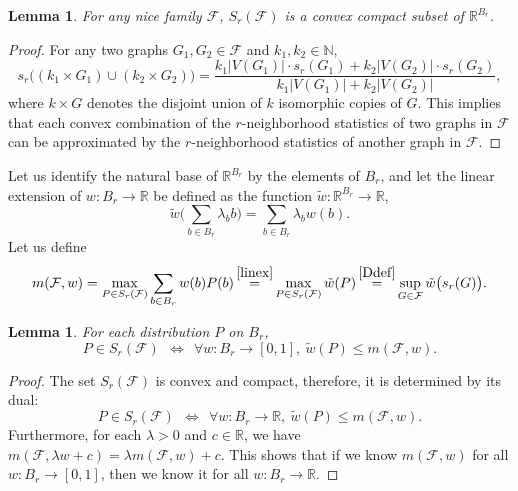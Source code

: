 \documentclass[12pt,a4paper]{article}
\newtheorem{Lemma}[Theorem]{Lemma}
\newcommand{\F}{\mathcal{F}}
\newcommand{\N}{\mathbb{N}}
\newcommand{\R}{\mathbb{R}}
\renewcommand{\:}{\colon}
\begin{document}
\begin{Lemma} \label{convex}
For any nice family $\F$, $S_r(\F)$ is a convex compact subset of $\R^{B_r}$.
\end{Lemma}

\begin{proof}
For any two graphs $G_1, G_2 \in \F$ and $k_1,k_2 \in \N$,
\begin{equation*}
s_r\big((k_1 \times G_1) \cup (k_2 \times G_2)\big) = \frac{k_1 |V(G_1)| \cdot s_r(G_1) + k_2 |V(G_2)| \cdot s_r(G_2)}{k_1 |V(G_1)| + k_2 |V(G_2)|},
\end{equation*}
where $k \times G$ denotes the disjoint union of $k$ isomorphic copies of $G$. 
This implies that each convex combination of the $r$-neighborhood statistics of two graphs in $\F$ can be approximated by the $r$-neighborhood statistics of another graph in $\F$.
\end{proof}

Let us identify the natural base of $\R^{B_r}$ by the elements of $B_r$, and let the linear extension of $w\: B_r \rightarrow \R$ be defined as the function $\tilde{w} \: \R^{B_r} \rightarrow \R$,
\begin{equation} \label{linex}
\tilde{w}\Big( \sum_{b \in B_r} \lambda_b b \Big) = \sum_{b \in B_r} \lambda_b w(b).
\end{equation}
Let us define
\begin{equation} \label{mdef}
m(\F, w) = \max_{P \in S_r(\F)} \sum_{b \in B_r} w(b) P(b) \mathop{=}^{\eqref{linex}} \max_{P \in S_r(\F)} \tilde{w}(P) \mathop{=}^{\eqref{Ddef}} \sup_{G \in \F} \tilde{w}\big( s_r(G) \big).
\end{equation}

\begin{Lemma}\label{lem:convexdist}
For each distribution $P$ on $B_r$,
\begin{equation*}
P \in S_r(\F)\ \ \Leftrightarrow\ \ \forall w\: B_r \rightarrow [0, 1],\ \tilde{w}(P) \le m(\F, w).
\end{equation*}
\end{Lemma}

\begin{proof}
The set $S_r(\F)$ is convex and compact, therefore, it is determined by its dual:
\begin{equation*}
P \in S_r(\F)\ \ \Leftrightarrow\ \ \forall w\: B_r \rightarrow \R,\ \tilde{w}(P) \le m(\F, w).
\end{equation*}
Furthermore, for each $\lambda > 0$ and $c \in \R$, we have $m(\F, \lambda w + c) = \lambda m(\F, w) + c$. This shows that if we know $m(\F, w)$ for all $w\: B_r \rightarrow [0, 1]$, then we know it for all $w\: B_r \rightarrow \R$.
\end{proof}
\end{document}
